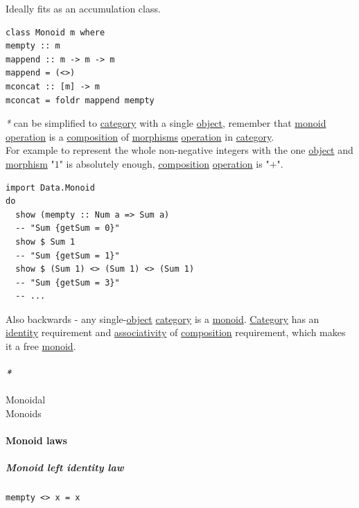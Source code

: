 \documentclass[a4paper,14pt,oneside]{book}
\begin{document}
Ideally fits as an accumulation class.\\

\begin{verbatim}
class Monoid m where
mempty :: m
mappend :: m -> m -> m
mappend = (<>)
mconcat :: [m] -> m
mconcat = foldr mappend mempty
\end{verbatim}

\emph{*} can be simplified to \hyperref[org75ddcd0]{category} with a single \hyperref[org93f0a32]{object}, remember that \hyperref[orgb6f1b3a]{monoid} \hyperref[org1e066f3]{operation} is a \hyperref[orgdb1d873]{composition} of \hyperref[org19cb6ec]{morphisms} \hyperref[org1e066f3]{operation} in \hyperref[org75ddcd0]{category}.\\
For example to represent the whole non-negative integers with the one \hyperref[org93f0a32]{object} and \hyperref[orgb1a35cd]{morphism} "\(1\)" is absolutely enough, \hyperref[orgdb1d873]{composition} \hyperref[org1e066f3]{operation} is "\(+\)".\\

\begin{verbatim}
import Data.Monoid
do
  show (mempty :: Num a => Sum a)
  -- "Sum {getSum = 0}"
  show $ Sum 1
  -- "Sum {getSum = 1}"
  show $ (Sum 1) <> (Sum 1) <> (Sum 1)
  -- "Sum {getSum = 3}"
  -- ...
\end{verbatim}

Also backwards - any single-\hyperref[org93f0a32]{object} \hyperref[org75ddcd0]{category} is a \hyperref[orgb6f1b3a]{monoid}. \hyperref[org75ddcd0]{Category} has an \hyperref[org0c2b817]{identity} requirement and \hyperref[org2d870be]{associativity} of \hyperref[orgdb1d873]{composition} requirement, which makes it a free \hyperref[orgb6f1b3a]{monoid}.\\

\paragraph{\emph{*}}
\label{sec:org72069ee}

\label{org076d777}Monoidal\\
\label{org8815e4b}Monoids\\

\paragraph{\label{org13eac63}Monoid laws}
\label{sec:org11db31d}
\subparagraph{\label{org6c49df2}Monoid left identity law}
\label{sec:org5121824}
\begin{verbatim}
mempty <> x = x
\end{verbatim}
\end{document}

